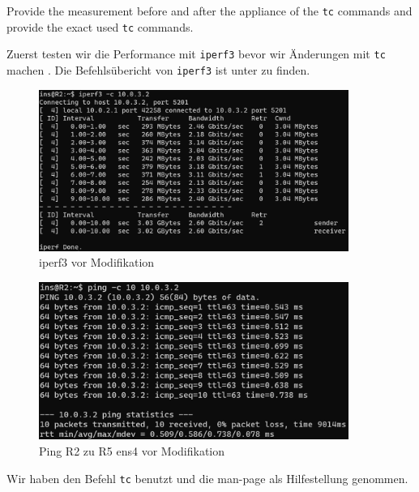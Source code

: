 \documentclass[11pt,titlepage]{article}
\newenvironment{shadedquotation}
 {\begin{shaded*}
  \quoting[leftmargin=0pt, vskip=0pt]
 }
 {\endquoting
 \end{shaded*}
}
\begin{document}
\begin{shadedquotation}
  Provide the measurement before and after the appliance of the \lstinline!tc! commands and provide the exact used \lstinline!tc! commands.
\end{shadedquotation}

Zuerst testen wir die Performance mit \lstinline!iperf3! bevor wir Änderungen mit \lstinline!tc! machen \cite{PERFORMANCE-IPERF-TC}. Die Befehlsübericht von \lstinline!iperf3! ist unter \cite{IPERF} zu finden.

\begin{figure}[H]
	\begin{center}
		\includegraphics[width=0.90\textwidth]{"images/iperf3 R2 prefuckery"}
		\caption{iperf3 vor Modifikation}
		\label{fig:iperf3-R2-prefuckery}
	\end{center}
\end{figure}
\begin{figure}[H]
	\begin{center}
		\includegraphics[width=0.90\textwidth]{"images/Ping R2 to R5 no delay"}
		\caption{Ping R2 zu R5 ens4 vor Modifikation}
		\label{fig:Ping-R2-to-R5-no-delay}
	\end{center}
\end{figure}
  
Wir haben den Befehl \lstinline!tc! benutzt und die man-page \cite{MAN-TC} als Hilfestellung genommen. 
\end{document}
